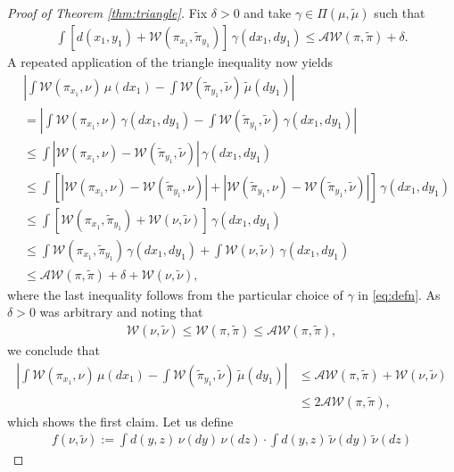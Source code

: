 \documentclass[10pt]{amsart}
\begin{document}
\begin{appendix}
\begin{proof}[Proof of Theorem \ref{thm:triangle}]
Fix $\delta>0$ and take $\gamma\in \Pi(\mu,\tilde{\mu})$ such that
\begin{align}\label{eq:defn}
\int\left[ d(x_1,y_1)+ \mathcal{W}(\pi_{x_1}, \tilde{\pi}_{y_1})\right] \, \gamma(dx_1,dy_1)\le \mathcal{AW}(\pi,\tilde{\pi})+\delta.
\end{align}
A repeated application of the triangle inequality now yields
\begin{align*}
&\left| \int \mathcal{W}(\pi_{x_1}, \nu)\,\mu (dx_1) - \int \mathcal{W}(\tilde{\pi}_{y_1}, \tilde{\nu})\,\tilde{\mu}(dy_1) \right| \\
&=\left| \int \mathcal{W}(\pi_{x_1}, \nu)\,\gamma (dx_1,dy_1) - \int \mathcal{W}(\tilde{\pi}_{y_1}, \tilde{\nu})\,\gamma(dx_1,dy_1) \right| \\
&\le \int |\mathcal{W}(\pi_{x_1},\nu)-\mathcal{W}(\tilde{\pi}_{y_1}, \tilde{\nu})|\,\gamma(dx_1,dy_1)\\
&\le  \int \left[|\mathcal{W}(\pi_{x_1},\nu)-\mathcal{W}(\tilde{\pi}_{y_1},\nu)|+|\mathcal{W}(\tilde{\pi}_{y_1},\nu)-\mathcal{W}(\tilde{\pi}_{y_1}, \tilde{\nu})|\right]\,\gamma(dx_1,dy_1)\\
&\le  \int \left[\mathcal{W}(\pi_{x_1},\tilde{\pi}_{y_1})+\mathcal{W}(\nu, \tilde{\nu})\right]\,\gamma(dx_1,dy_1)\\
&\le \int \mathcal{W}(\pi_{x_1},\tilde{\pi}_{y_1})\, \gamma(dx_1,dy_1)+\int \mathcal{W} (\nu, \tilde{\nu})\,\gamma(dx_1,dy_1)\\
&\le  \mathcal{AW}(\pi, \tilde{\pi})+\delta+\mathcal{W}(\nu,\tilde{\nu}),
\end{align*}
where the last inequality follows from the particular choice of $\gamma$ in \eqref{eq:defn}.
As $\delta>0$ was arbitrary and noting that
\begin{align}\label{eq:ineq2}
\mathcal{W}(\nu,\tilde{\nu})\le \mathcal{W}(\pi,\tilde{\pi})\le \mathcal{AW}(\pi,\tilde{\pi}),
\end{align}
we conclude that
\begin{align*}
\left| \int \mathcal{W}(\pi_{x_1}, \nu)\,\mu(dx_1) - \int \mathcal{W}(\tilde{\pi}_{y_1}, \tilde{\nu})\,\tilde{\mu}(dy_1) \right|&\le \mathcal{AW}(\pi, \tilde{\pi})+\mathcal{W}(\nu,\tilde{\nu})\\
&\le 2\mathcal{AW}(\pi, \tilde{\pi}),
\end{align*}
which shows the first claim. Let us  define 
\begin{align*}
f(\nu,\tilde{\nu}):=\int  d(y,z)\,\nu(dy)\,\nu(dz) \cdot \int  d(y,z)\,\tilde{\nu}(dy)\,\tilde{\nu}(dz)

\end{align*}
\end{proof}
\end{appendix}
\end{document}
